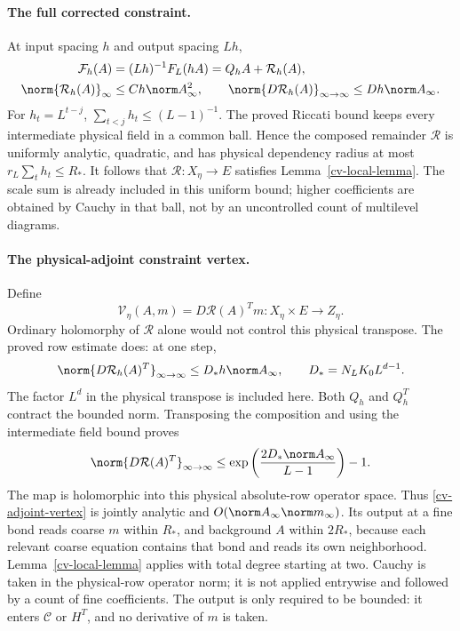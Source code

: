 \paragraph{The full corrected constraint.}
At input spacing $h$ and output spacing $Lh$,
\begin{equation}\label{cv-one-step}
 \begin{split}
 \mathcal F_h(A)&=(Lh)^{-1}F_L(hA)=Q_hA+\mathcal R_h(A),\\
 \norm{\mathcal R_h(A)}_\infty&\le Ch\norm A_\infty^2,
 \qquad
 \norm{D\mathcal R_h(A)}_{\infty\to\infty}
       \le Dh\norm A_\infty.
 \end{split}
\end{equation}
For $h_t=L^{t-j}$, $\sum_{t<j}h_t\le(L-1)^{-1}$.
The proved Riccati bound keeps every intermediate physical
field in a common ball. Hence the composed remainder
$\mathcal R$ is uniformly analytic, quadratic, and has
physical dependency radius at most
$r_L\sum_th_t\le R_*$.
It follows that $\mathcal R:X_\eta\to E$ satisfies
Lemma~\ref{cv-local-lemma}. The scale sum is already included
in this uniform bound; higher coefficients are obtained by
Cauchy in that ball, not by an uncontrolled count of
multilevel diagrams.

\paragraph{The physical-adjoint constraint vertex.}
Define
\begin{equation}\label{cv-adjoint-vertex}
 \mathcal V_\eta(A,m)=D\mathcal R(A)^Tm:
                X_\eta\times E\longrightarrow Z_\eta.
\end{equation}
Ordinary holomorphy of $\mathcal R$ alone would not control
this physical transpose. The proved row estimate does:
at one step,
\[
 \norm{D\mathcal R_h(A)^T}_{\infty\to\infty}
       \le D_*h\norm A_\infty,\qquad
 D_*=N_LK_0L^{d-1}.
\]
The factor $L^d$ in the physical transpose is included here.
Both $Q_h$ and $Q_h^T$ contract the bounded norm.
Transposing the composition and using the intermediate
field bound proves
\begin{equation}\label{cv-adjoint-bound}
 \norm{D\mathcal R(A)^T}_{\infty\to\infty}
    \le \exp\left(\frac{2D_*\norm A_\infty}{L-1}\right)-1.
\end{equation}
The map is holomorphic into this physical absolute-row
operator space. Thus \eqref{cv-adjoint-vertex} is jointly
analytic and $O(\norm A_\infty\norm m_\infty)$.
Its output at a fine bond reads coarse $m$ within $R_*$,
and background $A$ within $2R_*$, because each relevant
coarse equation contains that bond and reads its own
neighborhood. Lemma~\ref{cv-local-lemma} applies with
total degree starting at two. Cauchy is taken in the
physical-row operator norm; it is not applied entrywise
and followed by a count of fine coefficients.
The output is only required to be bounded: it enters
$\mathcal C$ or $H^T$, and no derivative of $m$ is taken.

